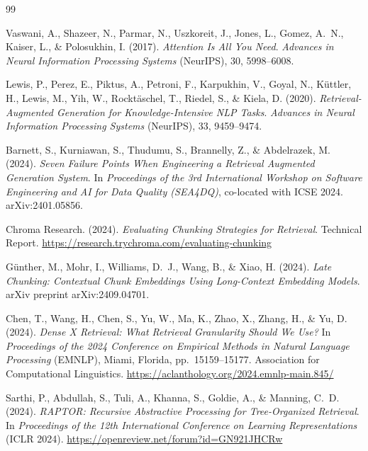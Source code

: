 \documentclass[12pt,a4paper]{report}
\theoremstyle{plain}
\theoremstyle{definition}
\begin{document}
	\clearpage
	
	\begin{thebibliography}{99}
		
		Vaswani, A., Shazeer, N., Parmar, N., Uszkoreit, J., Jones, L., Gomez, A.~N.,
		Kaiser, L., \& Polosukhin, I. (2017).
		\textit{Attention Is All You Need}.
		\textit{Advances in Neural Information Processing Systems} (NeurIPS), 30,
		5998--6008.
		
		Lewis, P., Perez, E., Piktus, A., Petroni, F., Karpukhin, V., Goyal, N.,
		Küttler, H., Lewis, M., Yih, W., Rocktäschel, T., Riedel, S., \& Kiela, D.
		(2020).
		\textit{Retrieval-Augmented Generation for Knowledge-Intensive NLP Tasks}.
		\textit{Advances in Neural Information Processing Systems} (NeurIPS), 33,
		9459--9474.
		
		Barnett, S., Kurniawan, S., Thudumu, S., Brannelly, Z., \& Abdelrazek, M.
		(2024).
		\textit{Seven Failure Points When Engineering a Retrieval Augmented Generation
			System}.
		In \textit{Proceedings of the 3rd International Workshop on Software
			Engineering and AI for Data Quality (SEA4DQ)}, co-located with ICSE 2024.
		arXiv:2401.05856.
		
		Chroma Research. (2024).
		\textit{Evaluating Chunking Strategies for Retrieval}.
		Technical Report.
		\url{https://research.trychroma.com/evaluating-chunking}
		
		Günther, M., Mohr, I., Williams, D.~J., Wang, B., \& Xiao, H. (2024).
		\textit{Late Chunking: Contextual Chunk Embeddings Using Long-Context Embedding
			Models}.
		arXiv preprint arXiv:2409.04701.
		
		Chen, T., Wang, H., Chen, S., Yu, W., Ma, K., Zhao, X., Zhang, H., \& Yu, D.
		(2024).
		\textit{Dense X Retrieval: What Retrieval Granularity Should We Use?}
		In \textit{Proceedings of the 2024 Conference on Empirical Methods in Natural
			Language Processing} (EMNLP), Miami, Florida, pp.\ 15159--15177.
		Association for Computational Linguistics.
		\url{https://aclanthology.org/2024.emnlp-main.845/}
		
		Sarthi, P., Abdullah, S., Tuli, A., Khanna, S., Goldie, A., \& Manning,
		C.~D. (2024).
		\textit{RAPTOR: Recursive Abstractive Processing for Tree-Organized Retrieval}.
		In \textit{Proceedings of the 12th International Conference on Learning
			Representations} (ICLR 2024).
		\url{https://openreview.net/forum?id=GN921JHCRw}
		

\end{thebibliography}
\end{document}
